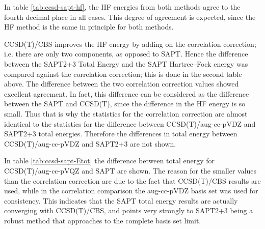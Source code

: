 

In table \ref{tab:ccsd-sapt-hf}, the HF energies from both methods agree to the fourth decimal place in all cases.
This degree of agreement is expected, since the HF method is the same in principle for both methods.

CCSD(T)/CBS improves the HF energy by adding on the correlation correction; i.e. there are only two components, as opposed to SAPT.
Hence the difference between the SAPT2+3 Total Energy and the SAPT Hartree--Fock energy was compared against the correlation correction; this is done in the second table above.
The difference between the two correlation correction values showed excellent agreement. 
In fact, this difference can be considered as the difference between the SAPT and CCSD(T), since the difference in the HF energy is so small.
Thus that is why the statistics for the correlation correction are almost identical to the statistics for the difference between CCSD(T)/aug-cc-pVDZ and SAPT2+3 total energies.
Therefore the differences in total energy between CCSD(T)/aug-cc-pVDZ and SAPT2+3 are not shown. 


In table \ref{tab:ccsd-sapt-Etot} the difference between total energy for CCSD(T)/aug-cc-pVQZ and SAPT are shown.
The reason for the smaller values than the correlation correction are due to the fact that CCSD(T)/CBS results are used, while in the correlation comparison the aug-cc-pVDZ basis set was used for consistency. 
This indicates that the SAPT total energy results are actually converging with CCSD(T)/CBS, and points very strongly to SAPT2+3 being a robust method that approaches to the complete basis set limit.


